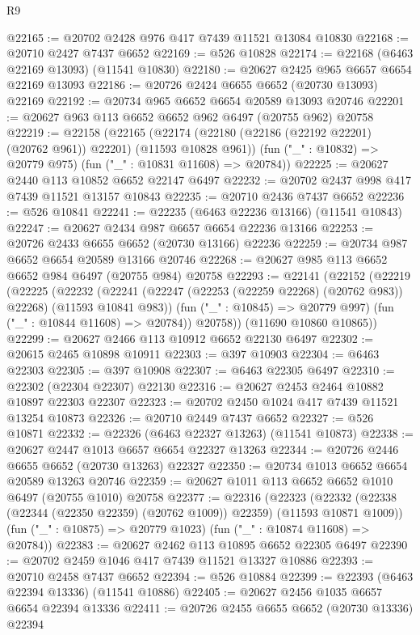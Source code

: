 \begin{lexlean}{R9}
\begin{coremodule}
{{{{{{{{{{{{{{{{{{{{{{{{{{{{{{{{{{{{{{{{{{{{{{{{{{{{{{{{{{{{{{{{{{{{{{{{{{{{{{{{{{{{@22165 := @20702 @2428 @976 @417 @7439 @11521 @13084 @10830
@22168 := @20710 @2427 @7437 @6652
@22169 := @526 @10828
@22174 := @22168 (@6463 @22169 @13093) (@11541 @10830)
@22180 := @20627 @2425 @965 @6657 @6654 @22169 @13093
@22186 := @20726 @2424 @6655 @6652 (@20730 @13093) @22169
@22192 := @20734 @965 @6652 @6654 @20589 @13093 @20746
@22201 := @20627 @963 @113 @6652 @6652 @962 @6497 (@20755 @962) @20758
@22219 := @22158
    (@22165
      (@22174 (@22180 (@22186 (@22192 @22201) (@20762 @961)) @22201) (@11593 @10828 @961))
      (fun ("_" : @10832) => @20779 @975)
      (fun ("_" : @10831 @11608) => @20784))
@22225 := @20627 @2440 @113 @10852 @6652 @22147 @6497
@22232 := @20702 @2437 @998 @417 @7439 @11521 @13157 @10843
@22235 := @20710 @2436 @7437 @6652
@22236 := @526 @10841
@22241 := @22235 (@6463 @22236 @13166) (@11541 @10843)
@22247 := @20627 @2434 @987 @6657 @6654 @22236 @13166
@22253 := @20726 @2433 @6655 @6652 (@20730 @13166) @22236
@22259 := @20734 @987 @6652 @6654 @20589 @13166 @20746
@22268 := @20627 @985 @113 @6652 @6652 @984 @6497 (@20755 @984) @20758
@22293 := @22141
    (@22152
      (@22219
        (@22225
          (@22232
            (@22241 (@22247 (@22253 (@22259 @22268) (@20762 @983)) @22268) (@11593 @10841 @983))
            (fun ("_" : @10845) => @20779 @997)
            (fun ("_" : @10844 @11608) => @20784))
          @20758))
      (@11690 @10860 @10865))
@22299 := @20627 @2466 @113 @10912 @6652 @22130 @6497
@22302 := @20615 @2465 @10898 @10911
@22303 := @397 @10903
@22304 := @6463 @22303
@22305 := @397 @10908
@22307 := @6463 @22305 @6497
@22310 := @22302 (@22304 @22307) @22130
@22316 := @20627 @2453 @2464 @10882 @10897 @22303 @22307
@22323 := @20702 @2450 @1024 @417 @7439 @11521 @13254 @10873
@22326 := @20710 @2449 @7437 @6652
@22327 := @526 @10871
@22332 := @22326 (@6463 @22327 @13263) (@11541 @10873)
@22338 := @20627 @2447 @1013 @6657 @6654 @22327 @13263
@22344 := @20726 @2446 @6655 @6652 (@20730 @13263) @22327
@22350 := @20734 @1013 @6652 @6654 @20589 @13263 @20746
@22359 := @20627 @1011 @113 @6652 @6652 @1010 @6497 (@20755 @1010) @20758
@22377 := @22316
    (@22323
      (@22332 (@22338 (@22344 (@22350 @22359) (@20762 @1009)) @22359) (@11593 @10871 @1009))
      (fun ("_" : @10875) => @20779 @1023)
      (fun ("_" : @10874 @11608) => @20784))
@22383 := @20627 @2462 @113 @10895 @6652 @22305 @6497
@22390 := @20702 @2459 @1046 @417 @7439 @11521 @13327 @10886
@22393 := @20710 @2458 @7437 @6652
@22394 := @526 @10884
@22399 := @22393 (@6463 @22394 @13336) (@11541 @10886)
@22405 := @20627 @2456 @1035 @6657 @6654 @22394 @13336
@22411 := @20726 @2455 @6655 @6652 (@20730 @13336) @22394
}}}}}}}}}}}}}}}}}}}}}}}}}}}}}}}}}}}}}}}}}}}}}}}}}}}}}}}}}}}}}}}}}}}}}}}}}}}}}}}}}}}}
\end{coremodule}
\end{lexlean}
